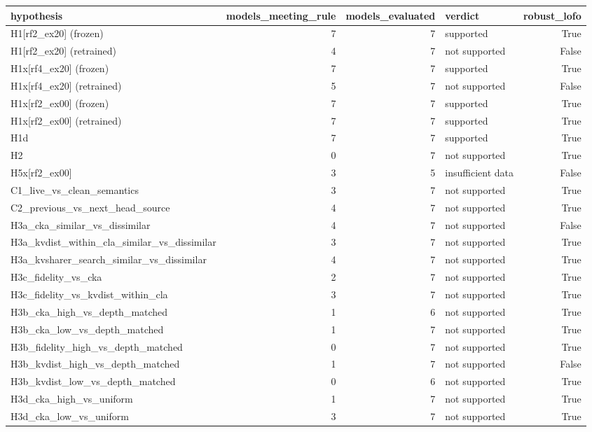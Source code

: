 \begin{table}[t]
\centering
\small
\begin{tabular}{lrrlr}
\toprule
hypothesis & models\_meeting\_rule & models\_evaluated & verdict & robust\_lofo \\
\midrule
H1[rf2\_ex20] (frozen) & 7 & 7 & supported & True \\
H1[rf2\_ex20] (retrained) & 4 & 7 & not supported & False \\
H1x[rf4\_ex20] (frozen) & 7 & 7 & supported & True \\
H1x[rf4\_ex20] (retrained) & 5 & 7 & not supported & False \\
H1x[rf2\_ex00] (frozen) & 7 & 7 & supported & True \\
H1x[rf2\_ex00] (retrained) & 7 & 7 & supported & True \\
H1d & 7 & 7 & supported & True \\
H2 & 0 & 7 & not supported & True \\
H5x[rf2\_ex00] & 3 & 5 & insufficient data & False \\
C1\_live\_vs\_clean\_semantics & 3 & 7 & not supported & True \\
C2\_previous\_vs\_next\_head\_source & 4 & 7 & not supported & True \\
H3a\_cka\_similar\_vs\_dissimilar & 4 & 7 & not supported & False \\
H3a\_kvdist\_within\_cla\_similar\_vs\_dissimilar & 3 & 7 & not supported & True \\
H3a\_kvsharer\_search\_similar\_vs\_dissimilar & 4 & 7 & not supported & True \\
H3c\_fidelity\_vs\_cka & 2 & 7 & not supported & True \\
H3c\_fidelity\_vs\_kvdist\_within\_cla & 3 & 7 & not supported & True \\
H3b\_cka\_high\_vs\_depth\_matched & 1 & 6 & not supported & True \\
H3b\_cka\_low\_vs\_depth\_matched & 1 & 7 & not supported & True \\
H3b\_fidelity\_high\_vs\_depth\_matched & 0 & 7 & not supported & True \\
H3b\_kvdist\_high\_vs\_depth\_matched & 1 & 7 & not supported & False \\
H3b\_kvdist\_low\_vs\_depth\_matched & 0 & 6 & not supported & True \\
H3d\_cka\_high\_vs\_uniform & 1 & 7 & not supported & True \\
H3d\_cka\_low\_vs\_uniform & 3 & 7 & not supported & True \\

\end{tabular}
\end{table}
